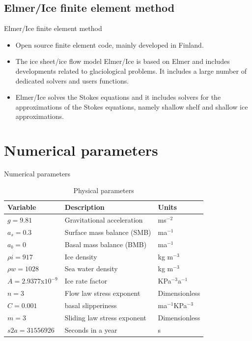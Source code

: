 \documentclass[11pt]{beamer}
\begin{document}
	\subsection{Elmer/Ice finite element method}
	\begin{frame}{Elmer/Ice finite element method}
		\justifying
		\begin{itemize}
			\item Open source finite element code, mainly developed in Finland.
			\item The ice sheet/ice flow model Elmer/Ice is based on Elmer and includes developments related to glaciological problems. It includes a large number of dedicated solvers and users functions.
			\item Elmer/Ice solves the Stokes equations and it includes solvers for the approximations of the Stokes equations, namely shallow shelf and shallow ice approximations.
		\end{itemize}
	\end{frame}
	\section{Numerical parameters}
		\begin{frame}{Numerical parameters}
		\justifying
		\begin{table}
			\begin{center}
				\caption{Physical parameters}
				\label{Physical constants}
				\begin{tabular}{|l|l|l|}
					\hline
					Variable          & Description                 & Units           \\ \hline
					$g=9.81$         & Gravitational acceleration  & ms$^{-2}$         \\ \hline
					$a_s=0.3$       & Surface mass balance (SMB)  & ma$^{-1}$         \\ \hline
					$a_b=0$             & Basal mass balance (BMB)    &   ma$^{-1}$         \\ \hline
					$\rho i=917$        & Ice density                 & kg m$^{-3}$       \\ \hline
					$\rho w=1028$      & Sea water density           & kg m$^{-3}$       \\ \hline
					$A= 2.9377$x$10^{-9}$ & Ice rate factor             & KPa$^{-3}$a$^{-1}$  \\ \hline
					$n=3$               & Flow law stress exponent    &  Dimensionless               \\ \hline
					$C=0.001$           & basal slipperiness          & ma$^{-1}$KPa$^{-3}$ \\ \hline
					$m=3$               & Sliding law stress exponent &   Dimensionless              \\ \hline
					$s2a=31556926$     & Seconds in a year           & s         \\ \hline
				\end{tabular}
			\end{center}
		\end{table}
		\end{frame}
\end{document}
